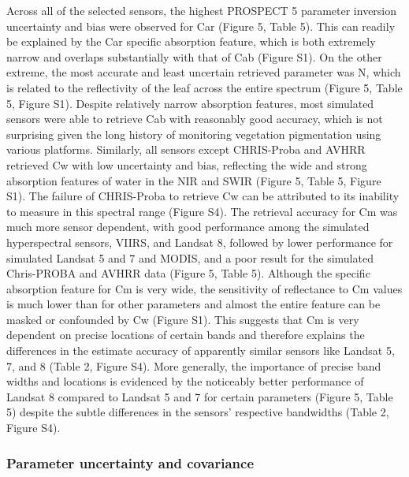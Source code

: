 Across all of the selected sensors, the highest PROSPECT 5 parameter inversion uncertainty and bias were observed for Car (Figure 5, Table 5). %
This can readily be explained by the Car specific absorption feature, which is both extremely narrow and overlaps substantially with that of Cab (Figure S1). %
On the other extreme, the most accurate and least uncertain retrieved parameter was N, which is related to the reflectivity of the leaf across the entire spectrum (Figure 5, Table 5, Figure S1). %
Despite relatively narrow absorption features, most simulated sensors were able to retrieve Cab with reasonably good accuracy, which is not surprising given the long history of monitoring vegetation pigmentation using various platforms.
Similarly, all sensors except CHRIS-Proba and AVHRR retrieved Cw with low uncertainty and bias, reflecting the wide and strong absorption features of water in the NIR and SWIR (Figure 5, Table 5, Figure S1). %
The failure of CHRIS-Proba to retrieve Cw can be attributed to its inability to measure in this spectral range (Figure S4). %
The retrieval accuracy for Cm was much more sensor dependent, with good performance among the simulated hyperspectral sensors, VIIRS, and Landsat 8, followed by lower performance for simulated Landsat 5 and 7 and MODIS, and a poor result for the simulated Chris-PROBA and AVHRR data (Figure 5, Table 5). %
Although the specific absorption feature for Cm is very wide, the sensitivity of reflectance to Cm values is much lower than for other parameters and almost the entire feature can be masked or confounded by Cw (Figure S1). %
This suggests that Cm is very dependent on precise locations of certain bands and therefore explains the differences in the estimate accuracy of apparently similar sensors like Landsat 5, 7, and 8 (Table 2, Figure S4). %
More generally, the importance of precise band widths and locations is evidenced by the noticeably better performance of Landsat 8 compared to Landsat 5 and 7 for certain parameters (Figure 5, Table 5) despite the subtle differences in the sensors’ respective bandwidths (Table 2, Figure S4). %

\subsubsection{Parameter uncertainty and covariance}

